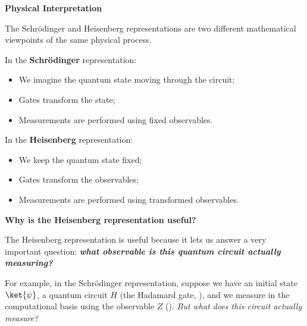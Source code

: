 \highspace
\begin{flushleft}
    \textcolor{Green3}{ \textbf{Physical Interpretation}}
\end{flushleft}
The Schrödinger and Heisenberg representations are two different mathematical viewpoints of the same physical process.

\highspace
In the \textbf{Schrödinger} representation:
\begin{itemize}
    \item We imagine the quantum state moving through the circuit;
    \item Gates transform the state;
    \item Measurements are performed using fixed observables.
\end{itemize}
In the \textbf{Heisenberg} representation:
\begin{itemize}
    \item We keep the quantum state fixed;
    \item Gates transform the observables;
    \item Measurements are performed using transformed observables.
\end{itemize}

\highspace
\begin{flushleft}
    \textcolor{Green3}{ \textbf{Why is the Heisenberg representation useful?}}
\end{flushleft}
The Heisenberg representation is useful because it lets us answer a very important question: \emph{\textbf{what observable is this quantum circuit actually measuring?}}

\highspace
For example, in the Schrödinger representation, suppose we have an initial state $\ket{\psi}$, a quantum circuit $H$ (the Hadamard gate, ), and we measure in the computational basis using the observable $Z$ (). \emph{But what does this circuit actually measure?}

